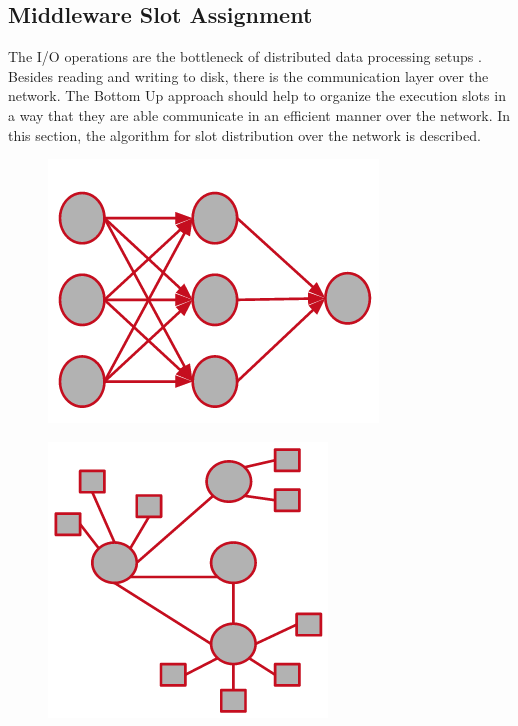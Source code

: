 \subsection{Middleware Slot Assignment}
The I/O operations are the bottleneck of distributed data processing setups \cite{cheating}. Besides
reading and writing to disk, there is the communication layer over the network. The Bottom Up
approach should help to organize the execution slots in a way that they are able communicate in an
efficient manner over the network. In this section, the algorithm for  slot distribution over the
network is described.

\begin{figure}
    \centering
    \begin{minipage}{0.5\textwidth}
        \centering
        \includegraphics[width=0.6\linewidth]{graphics/executiongraph.png}
        \label{fig:execution_graph}
    \end{minipage}%
    \begin{minipage}{0.5\textwidth}
        \centering
        \includegraphics[width=0.6\linewidth]{graphics/topology.png}
        \label{fig:network_topology}
    \end{minipage}
\end{figure}

